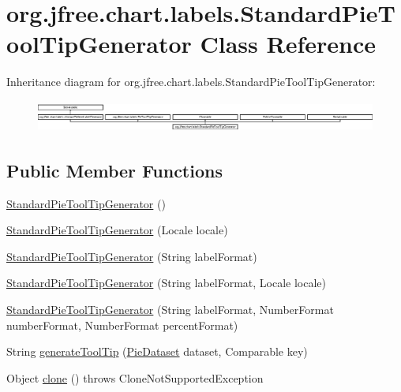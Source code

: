 \hypertarget{classorg_1_1jfree_1_1chart_1_1labels_1_1_standard_pie_tool_tip_generator}{}\section{org.\+jfree.\+chart.\+labels.\+Standard\+Pie\+Tool\+Tip\+Generator Class Reference}
\label{classorg_1_1jfree_1_1chart_1_1labels_1_1_standard_pie_tool_tip_generator}
Inheritance diagram for org.\+jfree.\+chart.\+labels.\+Standard\+Pie\+Tool\+Tip\+Generator\+:\begin{figure}[H]
\begin{center}
\leavevmode
\includegraphics[height=1.056604cm]{classorg_1_1jfree_1_1chart_1_1labels_1_1_standard_pie_tool_tip_generator}
\end{center}
\end{figure}
\subsection*{Public Member Functions}
\begin{DoxyCompactItemize}
\item 
\mbox{\hyperlink{classorg_1_1jfree_1_1chart_1_1labels_1_1_standard_pie_tool_tip_generator_a07ee8a666b99e941d8478bdffa77a10d}{Standard\+Pie\+Tool\+Tip\+Generator}} ()
\item 
\mbox{\hyperlink{classorg_1_1jfree_1_1chart_1_1labels_1_1_standard_pie_tool_tip_generator_a1abd74022df17ca884780d153754c846}{Standard\+Pie\+Tool\+Tip\+Generator}} (Locale locale)
\item 
\mbox{\hyperlink{classorg_1_1jfree_1_1chart_1_1labels_1_1_standard_pie_tool_tip_generator_af4f24c8ea4b559145059ab6f77030f00}{Standard\+Pie\+Tool\+Tip\+Generator}} (String label\+Format)
\item 
\mbox{\hyperlink{classorg_1_1jfree_1_1chart_1_1labels_1_1_standard_pie_tool_tip_generator_ab3ece860bf5795d061c48d45be218fea}{Standard\+Pie\+Tool\+Tip\+Generator}} (String label\+Format, Locale locale)
\item 
\mbox{\hyperlink{classorg_1_1jfree_1_1chart_1_1labels_1_1_standard_pie_tool_tip_generator_a2e2e5cdc69cb757afdbdda364b07831a}{Standard\+Pie\+Tool\+Tip\+Generator}} (String label\+Format, Number\+Format number\+Format, Number\+Format percent\+Format)
\item 
String \mbox{\hyperlink{classorg_1_1jfree_1_1chart_1_1labels_1_1_standard_pie_tool_tip_generator_a59dfcce924c57515c68bf382da8306c9}{generate\+Tool\+Tip}} (\mbox{\hyperlink{interfaceorg_1_1jfree_1_1data_1_1general_1_1_pie_dataset}{Pie\+Dataset}} dataset, Comparable key)
\item 
Object \mbox{\hyperlink{classorg_1_1jfree_1_1chart_1_1labels_1_1_standard_pie_tool_tip_generator_ad0756204ce3f8885ea6b636919b082ea}{clone}} ()  throws Clone\+Not\+Supported\+Exception 
\end{DoxyCompactItemize}
